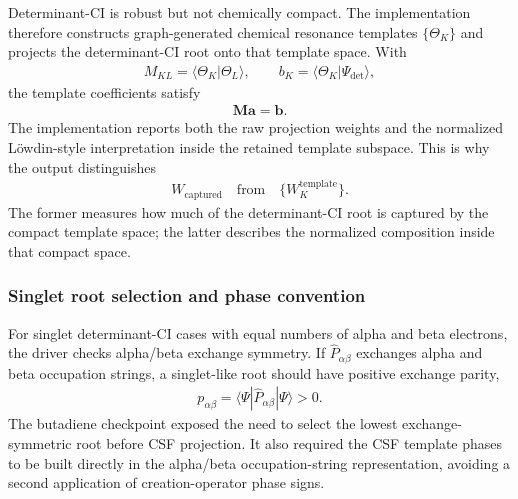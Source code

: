 \documentclass[11pt]{article}
\begin{document}
Determinant-CI is robust but not chemically compact.  The implementation therefore constructs graph-generated chemical resonance templates $\{\Theta_K\}$ and projects the determinant-CI root onto that template space.  With
\begin{equation}
\begin{aligned}
	M_{KL}=\langle\Theta_K|\Theta_L\rangle,
	\qquad
	b_K=\langle\Theta_K|\Psi_{\mathrm{det}}\rangle,
\end{aligned}
\end{equation}
the template coefficients satisfy
\begin{equation}
\begin{aligned}
	\mathbf{M}\mathbf{a}=\mathbf{b}.
\end{aligned}
\end{equation}
The implementation reports both the raw projection weights and the normalized L\"owdin-style interpretation inside the retained template subspace.  This is why the output distinguishes
\begin{equation}
\begin{aligned}
	W_{\mathrm{captured}}
	\quad\text{from}\quad
	\{W_K^{\mathrm{template}}\}.
\end{aligned}
\end{equation}
The former measures how much of the determinant-CI root is captured by the compact template space; the latter describes the normalized composition inside that compact space.

\subsubsection*{Singlet root selection and phase convention}

For singlet determinant-CI cases with equal numbers of alpha and beta electrons, the driver checks alpha/beta exchange symmetry.  If $\hat{P}_{\alpha\beta}$ exchanges alpha and beta occupation strings, a singlet-like root should have positive exchange parity,
\begin{equation}
\begin{aligned}
	p_{\alpha\beta}
	= \langle\Psi|\hat{P}_{\alpha\beta}|\Psi\rangle > 0.
\end{aligned}
\end{equation}
The butadiene checkpoint exposed the need to select the lowest exchange-symmetric root before CSF projection.  It also required the CSF template phases to be built directly in the alpha/beta occupation-string representation, avoiding a second application of creation-operator phase signs.
\end{document}
